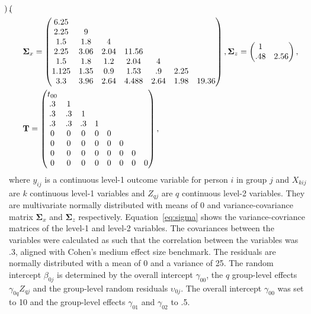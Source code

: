 \documentclass[10pt, a4paper, titlepage]{article}
\begin{document}
\begin{subequations}
\begin{align}
\begin{pmatrix}
        \end{pmatrix}, \\
        &\hspace{.5cm}\boldsymbol{\Sigma}_{x} = \begin{pmatrix}
            6.25& & & & & & \\
            2.25& 9& & & & & \\
            1.5& 1.8& 4& & & & \\
            2.25& 3.06& 2.04& 11.56& & & \\
            1.5& 1.8& 1.2& 2.04& 4& & \\
            1.125& 1.35& 0.9& 1.53& .9& 2.25& \\
            3.3& 3.96& 2.64& 4.488& 2.64& 1.98& 19.36
        \end{pmatrix}, \boldsymbol{\Sigma}_{z} = \begin{pmatrix}
            1& \\
            .48& 2.56
        \end{pmatrix}, \label{eq:sigma} \\ 
        &\hspace{.5cm}\mathbf{T} = \begin{pmatrix}
            t_{00}& & & & & & \\
              .3& 1& & & & & \\
              .3& .3& 1& & & & \\
              .3& .3& .3& 1& & & \\
              0& 0& 0& 0& 0& & \\
              0& 0& 0& 0& 0& 0& \\
              0& 0& 0& 0& 0& 0& 0 \\
              0& 0& 0& 0& 0& 0& 0& 0
        \end{pmatrix} \label{eq:T},
\end{align}
\end{subequations} where $y_{ij}$ is a continuous level-1 outcome variable for person $i$ in group $j$ and $X_{kij}$ are $k$ continuous level-1 variables and $Z_{qj}$ are $q$ continuous level-2 variables. They are multivariate normally distributed with means of 0 and variance-covariance matrix $\boldsymbol{\Sigma}_{x}$ and $\boldsymbol{\Sigma}_{z}$ respectively. Equation~\ref{eq:sigma} shows the variance-covriance matrices of the level-1 and level-2 variables. The covariances between the variables were calculated as such that the correlation between the variables was .3, aligned with Cohen's \citeyearpar{cohen1990} medium effect size benchmark. The residuals are normally distributed with a mean of 0 and a variance of 25. The random intercept $\beta_{0j}$ is determined by the overall intercept $\gamma_{00}$, the $q$ group-level effects $\gamma_{0q}Z_{qj}$ and the group-level random residuals $\upsilon_{0j}$. The overall intercept $\gamma_{00}$ was set to 10 and the group-level effects $\gamma_{01}$ and $\gamma_{02}$ to .5.
\end{document}
